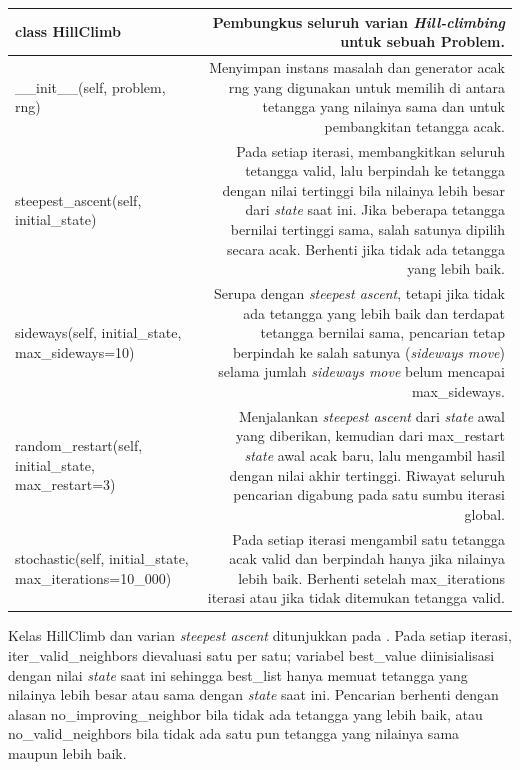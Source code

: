 \begin{longtable}{|K|D|}
class HillClimb & Pembungkus seluruh varian \textit{Hill-climbing} untuk sebuah Problem. \\ \hline
\_\_init\_\_(self, problem, rng) & Menyimpan instans masalah dan generator acak rng yang digunakan untuk memilih di antara tetangga yang nilainya sama dan untuk pembangkitan tetangga acak. \\ \hline
steepest\_ascent(self, initial\_state) & Pada setiap iterasi, membangkitkan seluruh tetangga valid, lalu berpindah ke tetangga dengan nilai tertinggi bila nilainya lebih besar dari \textit{state} saat ini. Jika beberapa tetangga bernilai tertinggi sama, salah satunya dipilih secara acak. Berhenti jika tidak ada tetangga yang lebih baik. \\ \hline
sideways(self, initial\_state, max\_sideways=10) & Serupa dengan \textit{steepest ascent}, tetapi jika tidak ada tetangga yang lebih baik dan terdapat tetangga bernilai sama, pencarian tetap berpindah ke salah satunya (\textit{sideways move}) selama jumlah \textit{sideways move} belum mencapai max\_sideways. \\ \hline
random\_restart(self, initial\_state, max\_restart=3) & Menjalankan \textit{steepest ascent} dari \textit{state} awal yang diberikan, kemudian dari max\_restart \textit{state} awal acak baru, lalu mengambil hasil dengan nilai akhir tertinggi. Riwayat seluruh pencarian digabung pada satu sumbu iterasi global. \\ \hline
stochastic(self, initial\_state, max\_iterations=10\_000) & Pada setiap iterasi mengambil satu tetangga acak valid dan berpindah hanya jika nilainya lebih baik. Berhenti setelah max\_iterations iterasi atau jika tidak ditemukan tetangga valid. \\ \hline
\end{longtable}

Kelas HillClimb dan varian \textit{steepest ascent} ditunjukkan pada . Pada setiap iterasi, iter\_valid\_neighbors dievaluasi satu per satu; variabel best\_value diinisialisasi dengan nilai \textit{state} saat ini sehingga best\_list hanya memuat tetangga yang nilainya lebih besar atau sama dengan \textit{state} saat ini. Pencarian berhenti dengan alasan no\_improving\_neighbor bila tidak ada tetangga yang lebih baik, atau no\_valid\_neighbors bila tidak ada satu pun tetangga yang nilainya sama maupun lebih baik.


